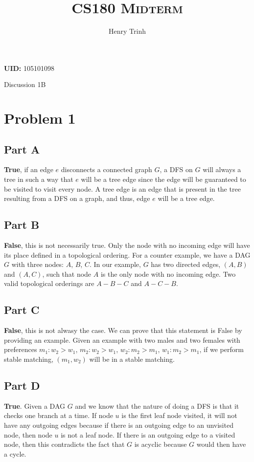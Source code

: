 \documentclass[12pt]{article}
\title{\textsc{CS180 Midterm}}
\author{Henry Trinh}
\begin{document}
\maketitle 
\begin{center}
    \textbf{UID:} 105101098
    
    Discussion 1B
\end{center}

\newpage
\section*{Problem 1}
\subsection*{Part A}
\textbf{True}, if an edge $e$ disconnects a connected graph $G$, a DFS on $G$ will always
a tree in such a way that $e$ will be a tree edge since the edge will be guaranteed
to be visited to visit every node. A tree edge is an edge that is present in the tree 
resulting from a DFS on a graph, and thus, edge $e$ will be a tree edge.
\subsection*{Part B}
\textbf{False}, this is not necessarily true. Only the node with no incoming edge will have
its place defined in a topological ordering. For a counter example, we have a DAG $G$ with three
nodes: $A$, $B$, $C$. In our example, $G$ has two directed edges, $(A, B)$ and $(A,C)$, such that
node $A$ is the only node with no incoming edge. Two valid topological orderings are 
$A-B-C$ and $A-C-B$.
\subsection*{Part C}
\textbf{False}, this is not alwasy the case. We can prove that this statement is False
by providing an example. Given an example with two males and two females with preferences 
${m_1: w_2 > w_1}$, ${m_2: w_2 > w_1}$, ${w_2: m_2 > m_1}$, ${w_1: m_2 > m_1}$, if we 
perform stable matching, $(m_1, w_2)$ will be in a stable matching.
\subsection*{Part D}
\textbf{True}. Given a DAG $G$ and we know that the nature of doing a DFS is that it checks one branch
at a time. If node $u$ is the first leaf node visited, it will not have any outgoing edges 
because if there is an outgoing edge to an unvisited node, then node $u$ is not a leaf node. If 
there is an outgoing edge to a visited node, then this contradicts the fact that $G$ is acyclic
because $G$ would then have a cycle.
\end{document}
